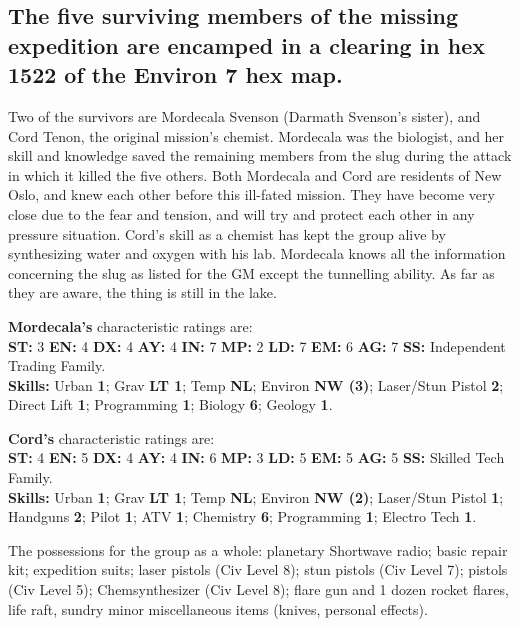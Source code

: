 \subsection[Survivors]{The five surviving members of the missing
  expedition are encamped in a clearing in hex 1522 of the  
  Environ 7 hex map.}
\label{sec:five-surv-memb}

Two of the survivors are Mordecala Svenson (Darmath Svenson's sister),
and Cord Tenon, the original mission's chemist. Mordecala was the
biologist, and her skill and knowledge saved the remaining members
from the slug during the attack in which it killed the five others.
Both Mordecala and Cord are residents of New Oslo, and knew each other
before this ill-fated mission. They have become very close due to the
fear and tension, and will try and protect each other in any pressure
situation. Cord's skill as a chemist has kept the group alive by
synthesizing water and oxygen with his lab. Mordecala knows all the
information concerning the slug as listed for the GM except the
tunnelling ability. As far as they are aware, the thing is still in
the lake.

\textbf{Mordecala's} characteristic ratings are: \\
\textbf{ST:} 3 \textbf{EN:} 4 \textbf{DX:} 4 \textbf{AY:} 4
\textbf{IN:} 7 \textbf{MP:} 2 \textbf{LD:} 7 \textbf{EM:} 6
\textbf{AG:} 7 \textbf{SS:} Independent Trading Family. \\ 
\textbf{Skills:} Urban \textbf{1}; Grav \textbf{LT 1}; Temp
\textbf{NL}; Environ \textbf{NW (3)}; Laser/Stun Pistol \textbf{2};
Direct Lift \textbf{1}; Programming 
\textbf{1}; Biology \textbf{6}; Geology \textbf{1}.

\textbf{Cord's} characteristic ratings are: \\
\textbf{ST:} 4 \textbf{EN:} 5 \textbf{DX:} 4 \textbf{AY:} 4
\textbf{IN:} 6 \textbf{MP:} 3 \textbf{LD:} 5 \textbf{EM:} 5
\textbf{AG:} 5 \textbf{SS:} Skilled Tech Family. \\ 
\textbf{Skills:} Urban \textbf{1}; Grav \textbf{LT 1}; Temp
\textbf{NL}; Environ \textbf{NW (2)}; Laser/Stun Pistol \textbf{1};
Handguns \textbf{2}; Pilot \textbf{1}; ATV \textbf{1}; Chemistry
\textbf{6}; Programming \textbf{1};  
Electro Tech \textbf{1}. 

The possessions for the group as a whole: planetary Shortwave radio;
basic repair kit; expedition suits; laser pistols (Civ Level 8); stun
pistols (Civ Level 7); pistols (Civ Level 5); Chemsynthesizer (Civ
Level 8); flare gun and 1 dozen rocket flares, life raft, sundry minor
miscellaneous items (knives, personal effects).

